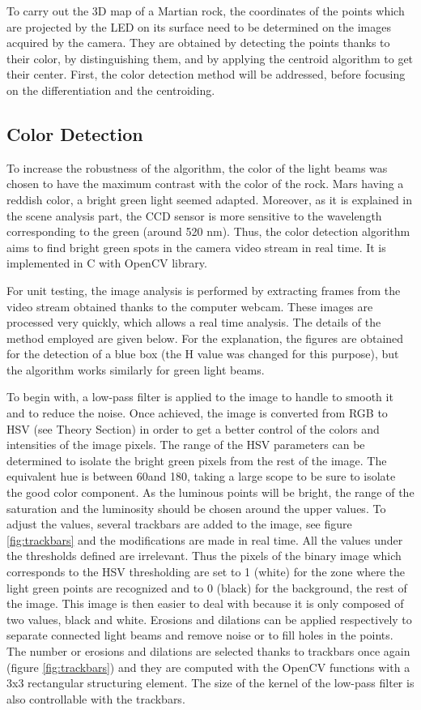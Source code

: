 To carry out the 3D map of a Martian rock, the coordinates of the points which are projected by the LED on its surface need to be determined on the images acquired by the camera. They are obtained by detecting the points thanks to their color, by distinguishing them, and by applying the centroid algorithm to get their center. First, the color detection method will be addressed, before focusing on the differentiation and the centroiding.

\subsection{Color Detection}

To increase the robustness of the algorithm, the color of the light beams was chosen to have the maximum contrast with the color of the rock. Mars having a reddish color, a bright green light seemed adapted. Moreover, as it is explained in the scene analysis part, the CCD sensor is more sensitive to the wavelength corresponding to the green (around 520 nm). Thus, the color detection algorithm aims to find bright green spots in the camera video stream in real time. It is implemented in C with OpenCV library. 

For unit testing, the image analysis is performed by extracting frames from the video stream obtained thanks to the computer webcam. These images are processed very quickly, which allows a real time analysis. The details of the method employed are given below. For the explanation, the figures are obtained for the detection of a blue box (the H value was changed for this purpose), but the algorithm works similarly for green light beams.

To begin with, a low-pass filter is applied to the image to handle to smooth it and to reduce the noise. Once achieved, the image is converted from RGB to HSV (see Theory Section) in order to get a better control of the colors and intensities of the image pixels. The range of the HSV parameters can be determined to isolate the bright green pixels from the rest of the image. The equivalent hue is between 60\degree  and 180\degree, taking a large scope to be sure to isolate the good color component. As the luminous points will be bright, the range of the saturation and the luminosity should be chosen around the upper values. To adjust the values, several trackbars are added to the image, see figure \ref{fig:trackbars} and the modifications are made in real time. All the values under the thresholds defined are irrelevant. Thus the pixels of the binary image which corresponds to the HSV thresholding are set to 1 (white) for the zone where the light green points are recognized and to 0 (black) for the background, the rest of the image. This image is then easier to deal with because it is only composed of two values, black and white. Erosions and dilations can be applied respectively to separate connected light beams and remove noise or to fill holes in the points. The number or erosions and dilations are selected thanks to trackbars once again (figure \ref{fig:trackbars}) and they are computed with the OpenCV functions with a 3x3 rectangular structuring element. The size of the kernel of the low-pass filter is also controllable with the trackbars. 

